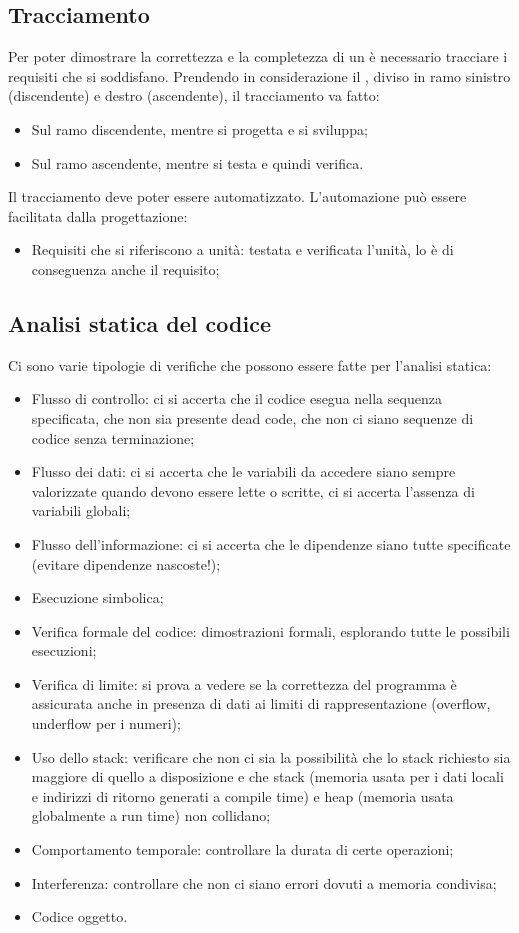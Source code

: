 \documentclass[../main]{subfiles}
\begin{document}
\subsection{Tracciamento}
Per poter dimostrare la correttezza e la completezza di un  è necessario tracciare i requisiti che si soddisfano. Prendendo in considerazione il , diviso in ramo sinistro (discendente) e destro (ascendente), il tracciamento va fatto:
\begin{itemize}
    \item Sul ramo discendente, mentre si progetta e si sviluppa;
    \item Sul ramo ascendente, mentre si testa e quindi verifica.
\end{itemize}
Il tracciamento deve poter essere automatizzato. L'automazione può essere facilitata dalla progettazione:
\begin{itemize}
    \item Requisiti che si riferiscono a unità: testata e verificata l'unità, lo è di conseguenza anche il requisito;
\end{itemize}
\subsection{Analisi statica del codice}
Ci sono varie tipologie di verifiche che possono essere fatte per l'analisi statica:
\begin{itemize}
    \item Flusso di controllo: ci si accerta che il codice esegua nella sequenza specificata, che non sia presente dead code, che non ci siano sequenze di codice senza terminazione;
    \item Flusso dei dati: ci si accerta che le variabili da accedere siano sempre valorizzate quando devono essere lette o scritte, ci si accerta l'assenza di variabili globali;
    \item Flusso dell’informazione: ci si accerta che le dipendenze siano tutte specificate (evitare dipendenze nascoste!);
    \item Esecuzione simbolica;
    \item Verifica formale del codice: dimostrazioni formali, esplorando tutte le possibili esecuzioni;
    \item Verifica di limite: si prova a vedere se la correttezza del programma è assicurata anche in presenza di dati ai limiti di rappresentazione (overflow, underflow per i numeri);
    \item Uso dello stack: verificare che non ci sia la possibilità che lo stack richiesto sia maggiore di quello a disposizione e che stack (memoria usata per i dati locali e indirizzi di ritorno generati a compile time) e heap (memoria usata globalmente a run time) non collidano;
    \item Comportamento temporale: controllare la durata di certe operazioni;
    \item Interferenza: controllare che non ci siano errori dovuti a memoria condivisa;
    \item Codice oggetto.
\end{itemize}
\end{document}
